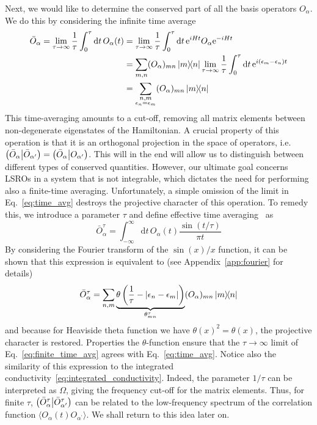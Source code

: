Next, we would like to determine the conserved part of all the basis operators \(O_{\alpha}\). We do this
by considering the infinite time average 
\begin{align}
    \bar{O}_{\alpha} = \lim_{\tau\to\infty}\frac{1}{\tau} \int_0^{\tau} \mathrm{d}t\, O_{\alpha}(t) &= 
     \lim_{\tau\to\infty}\frac{1}{\tau} \int_0^{\tau} \mathrm{d}t\, \mathrm{e}^{i H t}O_{\alpha} \mathrm{e}^{-i H t} \nonumber\\
     &= \sum_{m,n} (O_{\alpha})_{mn}\ketbra{m}{n} \lim_{\tau\to\infty} \frac{1}{\tau} \int_0^{\tau} \mathrm{d}t \, \mathrm{e}^{i(\epsilon_m-\epsilon_n)t} \nonumber\\
    &= \sum_{\substack{n,m \\ \epsilon_n = \epsilon_m}} (O_{\alpha})_{mn}\ketbra{m}{n}
    \label{eq:time_avg}
\end{align}
This time-averaging amounts to a cut-off, removing all matrix elements between non-degenerate eigenstates
of the Hamiltonian. A crucial property of this operation is that it is an orthogonal projection
in the space of operators, i.e. \(\left(\bar{O}_{\alpha} \middle| \bar{O}_{\alpha^{\prime}}\right) = \left(\bar{O}_{\alpha} \middle| O_{\alpha^{\prime}}\right)\). This will
in the end will allow us to distinguish between different types of conserved quantities.
However, our ultimate goal concerns LSROs in a system that is not integrable, which dictates the
need for performing also a finite-time averaging. Unfortunately, a simple omission of the limit
in Eq.~\eqref{eq:time_avg} destroys the projective character of this operation. To remedy this,
we introduce a parameter \(\tau\) and define effective time averaging~\autocite{Mierzejewski2015}
as
\begin{equation}
    \bar{O}_{\alpha}^{\tau} = \int_{-\infty}^{\infty} \mathrm{d}t\, O_{\alpha}(t) \frac{\sin(t/\tau)}{\pi t}
\end{equation}
By considering the Fourier transform of the \(\sin(x)/x\) function, it can be shown that
this expression is equivalent to (see Appendix~\ref{app:fourier} for details)
\begin{equation}
    \bar{O}_{\alpha}^{\tau} = \sum_{n,m} \underbrace{\theta\left(\frac{1}{\tau} - |\epsilon_n - \epsilon_m|\right)}_{\theta_{mn}^{\tau}} (O_{\alpha})_{mn} \ketbra{m}{n}
\label{eq:finite_time_avg}
\end{equation}
and because for Heaviside theta function we have \(\theta(x)^2 = \theta(x)\), the projective character is restored. 
Properties the \(\theta\)-function ensure that the \(\tau\to\infty\) limit of Eq.~\eqref{eq:finite_time_avg}
agrees with Eq.~\eqref{eq:time_avg}. Notice also the similarity of this expression to the integrated conductivity~\eqref{eq:integrated_conductivity}.
Indeed, the parameter \(1/\tau\) can be interpreted as \(\Omega\), giving the frequency cut-off for the matrix elements.
Thus, for finite \(\tau\), \(\left(\bar{O}_{\alpha}^{\tau} \middle| \bar{O}_{\alpha^{\prime}}^{\tau}\right)\) can be related to the low-frequency spectrum of 
the correlation function \(\langle O_{\alpha}(t) O_{\alpha^{\prime}} \rangle\). We shall return to this idea later on.

